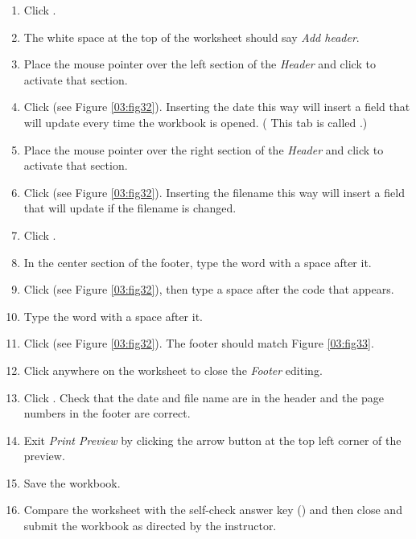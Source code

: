 \begin{enumerate}
	\item Click . 
	\item The white space at the top of the worksheet should say \textit{Add header}. 
	\item Place the mouse pointer over the left section of the \textit{Header} and click to activate that section.
	\item Click  (see Figure \ref{03:fig32}). Inserting the date this way will insert a field that will update every time the workbook is opened. ( This tab is called .)
	\item Place the mouse pointer over the right section of the \textit{Header} and click to activate that section.
	\item Click  (see Figure \ref{03:fig32}). Inserting the filename this way will insert a field that will update if the filename is changed.
	\item Click . 
	\item In the center section of the footer, type the word  with a space after it.
	\item Click  (see Figure \ref{03:fig32}), then type a space after the \fmtTyping{\&[Page]} code that appears.
	\item Type the word  with a space after it.
	\item Click  (see Figure \ref{03:fig32}). The footer should match Figure \ref{03:fig33}.
	\item Click anywhere on the worksheet to close the \textit{Footer} editing.
	\item Click . Check that the date and file name are in the header and the page numbers in the footer are correct.
	\item Exit \textit{Print Preview} by clicking the arrow button at the top left corner of the preview.
	\item Save the  workbook.
	\item Compare the worksheet with the self-check answer key () and then close and submit the  workbook as directed by the instructor.
\end{enumerate}

